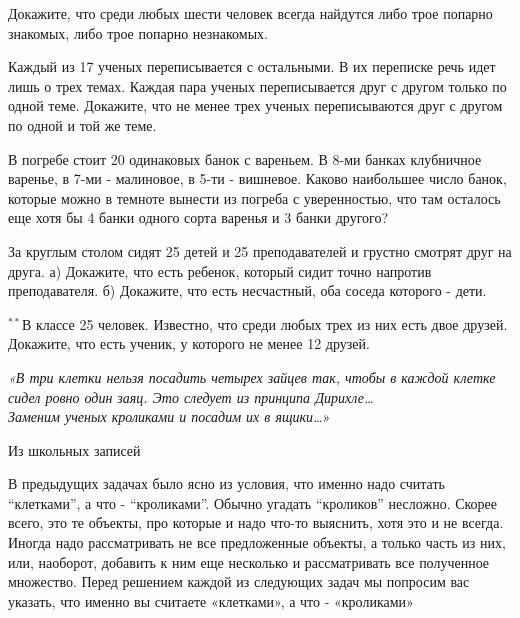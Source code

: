 \begin{thm}
	Докажите, что среди любых шести человек всегда найдутся либо трое попарно знакомых, либо трое попарно незнакомых.
\end{thm}

\begin{thm}
	Каждый из 17 ученых переписывается с остальными. В их переписке речь идет лишь о трех темах. Каждая пара ученых переписывается друг с другом только по одной теме. Докажите, что не менее трех ученых переписываются друг с другом по одной и той же теме.
\end{thm}

\begin{thm}
	В погребе стоит 20 одинаковых банок с вареньем. В 8-ми банках клубничное варенье, в 7-ми - малиновое, в 5-ти - вишневое. Каково наибольшее число банок, которые можно в темноте вынести из погреба с уверенностью, что там осталось еще хотя бы 4 банки одного сорта варенья и 3 банки другого? 
\end{thm}

\begin{thm}
	За круглым столом сидят 25 детей и 25 преподавателей и грустно смотрят друг на друга.
	а) Докажите, что есть ребенок, который сидит точно напротив преподавателя.
	б) Докажите, что есть несчастный, оба соседа которого - дети.
\end{thm}
\begin{thm}
	$^{\ast\ast}$В классе 25 человек. Известно, что среди любых трех из них есть двое друзей. Докажите, что есть ученик, у которого не менее 12 друзей.
\end{thm}


\epigraph{ \textit{«В три клетки нельзя посадить четырех зайцев так, чтобы в каждой клетке сидел ровно один заяц. Это следует из принципа Дирихле\dots} \\ \textit{Заменим ученых кроликами и посадим их в ящики\dots}»}{Из школьных записей}
В предыдущих задачах было ясно из условия, что именно надо считать “клетками”, а что - “кроликами”. Обычно угадать “кроликов” несложно. Скорее всего, это те объекты, про которые и надо что-то выяснить, хотя это и не всегда. Иногда надо рассматривать не все предложенные объекты, а только часть из них, или, наоборот, добавить к ним еще несколько и рассматривать все полученное множество. Перед решением каждой из следующих задач мы попросим вас указать, что именно вы считаете «клетками», а что - «кроликами»

